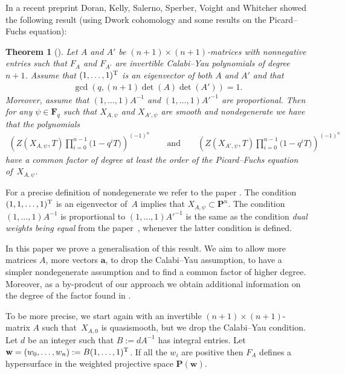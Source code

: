 \documentclass[pdftex]{sigma}
\numberwithin{equation}{section}
\newtheorem{Theorem}{Theorem}[section]
\begin{document}
In a recent preprint Doran, Kelly, Salerno, Sperber, Voight and Whitcher \cite{DKSSVW} showed the following result (using Dwork cohomology and some results on the Picard--Fuchs equation):
\begin{Theorem}[\cite{DKSSVW}]\label{thmDKSSVW} Let $A$ and $A'$ be $(n+1)\times (n+1)$-matrices with nonnegative entries such that $F_A$ and $F_{A'}$ are invertible Calabi--Yau polynomials of degree $n+1$. Assume that $(1,\dots,1)^{\rm T}$ is an eigenvector of both $A$ and $A'$ and that \begin{gather*}\gcd(q,(n+1)\det(A)\det(A'))=1.\end{gather*}
Moreover, assume that $(1,\dots,1)A^{-1}$ and $(1,\dots,1){A'}^{-1}$ are proportional. Then for any $\psi\in \mathbf{F}_q$ such that $X_{A,\psi}$ and $X_{A',\psi}$ are smooth and nondegenerate we have that the polynomials
\begin{gather*} \left(Z(X_{A,\psi},T)\prod_{i=0}^{n-1}\big(1-q^iT\big) \right)^{(-1)^{n}}\qquad \mbox{and} \qquad
 \left(Z(X_{A',\psi},T)\prod_{i=0}^{n-1}\big(1-q^iT\big) \right)^{(-1)^{n}}\end{gather*}
have a common factor of degree at least the order of the Picard--Fuchs equation of~$X_{A,\psi}$.
\end{Theorem}
For a precise def\/inition of nondegenerate we refer to the paper \cite{DKSSVW}. The condition $(1,1,\dots,1)^{\rm T}$ is an eigenvector of~$A$ implies that $X_{A,\psi}\subset \mathbf{P}^n$. The condition $(1,\dots,1)A^{-1}$ is proportional to $(1,\dots,1){A'}^{-1}$ is the same as the condition \emph{dual weights being equal} from the paper~\cite{DKSSVW}, whenever the latter condition is def\/ined.

In this paper we prove a generalisation of this result. We aim to allow more matrices $A$, more vectors $\mathbf{a}$, to drop the Calabi--Yau assumption, to have a simpler nondegenerate assumption and to f\/ind a common factor of higher degree. Moreover, as a by-prodcut of our approach we obtain additional information on the degree of the factor found in \cite{DKSSVW}.

To be more precise, we start again with an invertible $(n+1)\times (n+1)$-matrix $A$ such that~$X_{A,0}$ is quasismooth, but we drop the Calabi--Yau condition. Let $d$ be an integer such that $B:=dA^{-1}$ has integral entries. Let $\mathbf{w}=(w_0,\dots,w_n):=B(1,\dots,1)^{\rm T}$. If all the $w_i$ are positive then $F_A$ def\/ines a hypersurface in the weighted projective space $\mathbf{P}(\mathbf{w})$.
\end{document}
